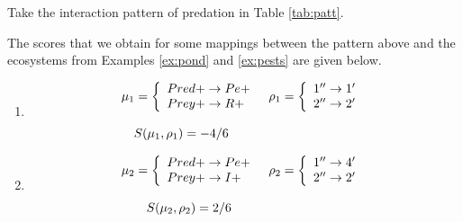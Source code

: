 \documentclass[a4paper,twoside]{article}
\begin{document}
\begin{example} \label{ex:patterns}
Take the interaction pattern of predation in Table \ref{tab:patt}. 


The scores that we obtain for some mappings between the pattern above
and the ecosystems from Examples \ref{ex:pond} and  \ref{ex:pests} are given below.

\begin{enumerate}

\item $$\begin{array}{l@{\hspace{3mm}}l@{\hspace{3mm}}}
	\mapcomp_1=\left\{
					\begin{array}{l}
					Pred+ \to Pe+ \\
                    Prey+ \to R+ \\
				\end{array}\right.        
                    &
     \maprule_1=\left\{
                \begin{array}{l}
                    1'' \to 1' \\
					2'' \to 2' \\
					\end{array}\right.
                    \\     \\         
 \quad  \gf(\mapcomp_1,\maprule_1)=-4/6
     \end{array}$$

\item $$\begin{array}{l@{\hspace{3mm}}l@{\hspace{3mm}}}
	\mapcomp_2=\left\{
				\begin{array}{l}
					Pred+ \to Pe+ \\
                    Prey+ \to I+ \\
				\end{array}\right.
                    &
     \maprule_2=\left\{
                \begin{array}{l}
                    1'' \to 4' \\
					2'' \to 2' \\
					\end{array}\right.
                \\ \\
   \qquad  \gf(\mapcomp_2,\maprule_2)=2/6
\end{array}$$
                

\end{enumerate}
\end{example}
\end{document}
